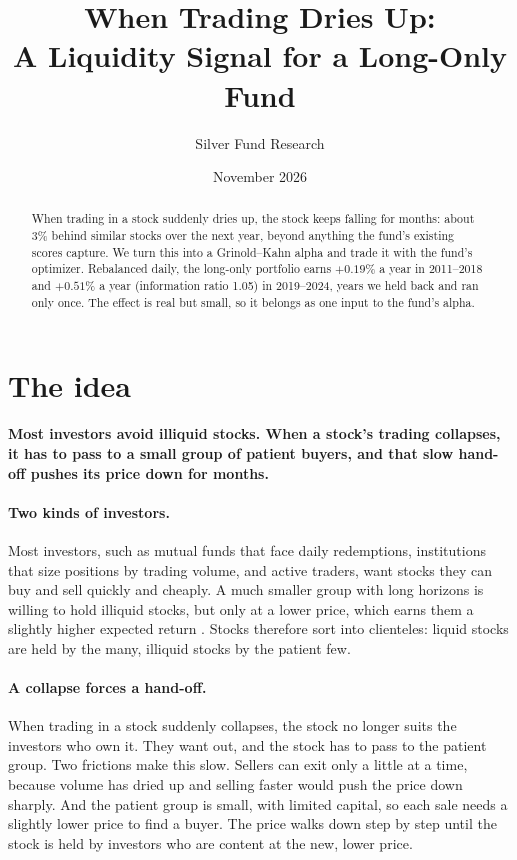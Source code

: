 \documentclass[11pt]{article}
\title{When Trading Dries Up:\\A Liquidity Signal for a Long-Only Fund}
\author{Silver Fund Research}
\date{November 2026}
\newcommand{\takeaway}[1]{\noindent\textbf{#1}\par\smallskip}
\begin{document}
\maketitle

\begin{abstract}
\noindent
When trading in a stock suddenly dries up, the stock keeps falling for months: about 3\% behind similar
stocks over the next year, beyond anything the fund's existing scores capture. We turn this into a Grinold--Kahn
alpha and trade it with the fund's optimizer. Rebalanced daily, the long-only portfolio earns $+0.19\%$ a year in
2011--2018 and $+0.51\%$ a year (information ratio 1.05) in 2019--2024, years we held back and ran only once.
The effect is real but small, so it belongs as one input to the fund's alpha.
\end{abstract}

\section{The idea}
\takeaway{Most investors avoid illiquid stocks. When a stock's trading collapses, it has to pass to a small group of patient
buyers, and that slow hand-off pushes its price down for months.}

\paragraph{Two kinds of investors.} Most investors, such as mutual funds that face daily redemptions, institutions that
size positions by trading volume, and active traders, want stocks they can buy and sell quickly and cheaply. A much smaller
group with long horizons is willing to hold illiquid stocks, but only at a lower price, which earns them a slightly higher
expected return \citep{amihud1986}. Stocks therefore sort into clienteles: liquid stocks are held by the many, illiquid
stocks by the patient few.

\paragraph{A collapse forces a hand-off.} When trading in a stock suddenly collapses, the stock no longer suits the investors
who own it. They want out, and the stock has to pass to the patient group. Two frictions make this slow. Sellers can exit only
a little at a time, because volume has dried up and selling faster would push the price down sharply. And the patient group
is small, with limited capital, so each sale needs a slightly lower price to find a buyer. The price walks down step by step
until the stock is held by investors who are content at the new, lower price.
\end{document}
